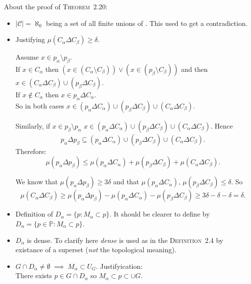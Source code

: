 About the proof of \textsc{Theorem}~2.20:
\begin{itemize}
\item \(|\mathscr{C}|=\aleph_0\) being a set of all finite unions of \scrB.
  This used to get a contradiction.
\item Justifying \(\mu(C_\alpha \Delta C_\beta) \geq \delta\).

  Assume \(x\in p_\alpha \setminus p_\beta\).\\
  If \(x\in C_\alpha\) then 
  \((x \in (C_\alpha \setminus C_\beta))\lor(x\in (p_\beta \setminus C_\beta))\)
  and then \(x\in (C_\alpha \Delta C_\beta) \cup (p_\beta \Delta C_\beta)\).
  \\
  If \(x\notin C_\alpha\) then \(x \in p_\alpha \Delta C_\alpha\).\\
  So in both cases 
    \(x \in (p_\alpha \Delta C_\alpha) \cup (p_\beta \Delta C_\beta) 
      \cup  (C_\alpha \Delta C_\beta)\).

  Similarly, if \(x\in p_\beta \setminus p_\alpha\)
    \(x \in (p_\alpha \Delta C_\alpha) \cup (p_\beta \Delta C_\beta) 
      \cup  (C_\alpha \Delta C_\beta)\). Hence
  \begin{equation*}
    p_\alpha \Delta p_\beta \subseteq
    (p_\alpha \Delta C_\alpha) \cup (p_\beta \Delta C_\beta) 
      \cup  (C_\alpha \Delta C_\beta).
  \end{equation*}
  Therefore:
  \begin{equation*}
    \mu(p_\alpha \Delta p_\beta) \leq
    \mu(p_\alpha \Delta C_\alpha) + \mu(p_\beta \Delta C_\beta) 
      + \mu(C_\alpha \Delta C_\beta).
  \end{equation*}

  We know that \(\mu(p_\alpha \Delta p_\beta) \geq 3\delta\)
  and that 
  \(\mu(p_\alpha \Delta C_\alpha),\,\mu(p_\beta \Delta C_\beta) \leq \delta\).
  So
  \begin{equation*}
  \mu(C_\alpha \Delta C_\beta) \geq
    \mu(p_\alpha \Delta p_\beta)
      - \mu(p_\alpha \Delta C_\alpha) - \mu(p_\beta \Delta C_\beta) 
  \geq 3\delta - \delta - \delta = \delta.
  \end{equation*}

\item Definition of \(D_\alpha = \{p: M_\alpha \subset p\}\).
  It should be clearer to define by 
  \(D_\alpha = \{p\in\mathbb{P}: M_\alpha \subset p\}\).

\item \(D_\alpha\) is dense. To clarify here \emph{dense} 
  is used as in the \textsc{Definition}~2.4
  by existance of a superset (\emph{not} the topological meaning).

\item \(G\cap D_\alpha\neq\emptyset\;\implies\; M_\alpha \subset U_G\).
   Justifyication:\\
   There exists \(p \in G\cap D_\alpha\) so \(M_\alpha \subset p \subset \cup G\).

\end{itemize}

